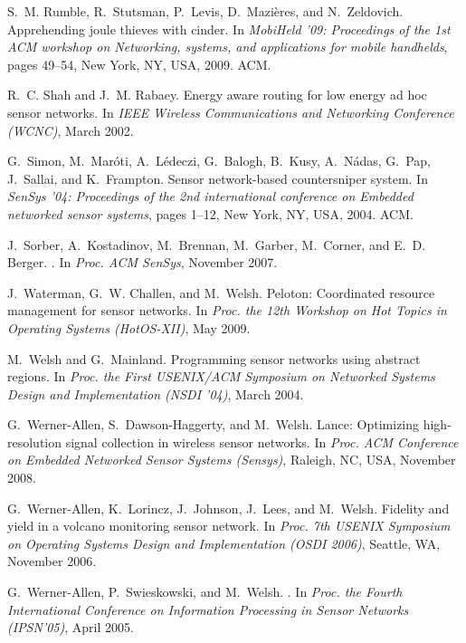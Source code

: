 \documentclass{sig-alternate}
\begin{document}
\begin{footnotesize}
\begin{thebibliography}{10}
S.~M. Rumble, R.~Stutsman, P.~Levis, D.~Mazi\`{e}res, and N.~Zeldovich.
\newblock Apprehending joule thieves with cinder.
\newblock In {\em MobiHeld '09: Proceedings of the 1st ACM workshop on
  Networking, systems, and applications for mobile handhelds}, pages 49--54,
  New York, NY, USA, 2009. ACM.

R.~C. Shah and J.~M. Rabaey.
\newblock Energy aware routing for low energy ad hoc sensor networks.
\newblock In {\em IEEE Wireless Communications and Networking Conference
  (WCNC)}, March 2002.

G.~Simon, M.~Mar\'{o}ti, A.~L\'{e}deczi, G.~Balogh, B.~Kusy, A.~N\'{a}das,
  G.~Pap, J.~Sallai, and K.~Frampton.
\newblock Sensor network-based countersniper system.
\newblock In {\em SenSys '04: Proceedings of the 2nd international conference
  on Embedded networked sensor systems}, pages 1--12, New York, NY, USA, 2004.
  ACM.

J.~Sorber, A.~Kostadinov, M.~Brennan, M.~Garber, M.~Corner, and E.~D. Berger.
.
\newblock In {\em Proc. ACM SenSys}, November 2007.

J.~Waterman, G.~W. Challen, and M.~Welsh.
\newblock Peloton: Coordinated resource management for sensor networks.
\newblock In {\em Proc. the 12th Workshop on Hot Topics in Operating Systems
  (HotOS-XII)}, May 2009.

M.~Welsh and G.~Mainland.
\newblock Programming sensor networks using abstract regions.
\newblock In {\em Proc. the First USENIX/ACM Symposium on Networked Systems
  Design and Implementation (NSDI '04)}, March 2004.

G.~Werner-Allen, S.~Dawson-Haggerty, and M.~Welsh.
\newblock Lance: Optimizing high-resolution signal collection in wireless
  sensor networks.
\newblock In {\em Proc. ACM Conference on Embedded Networked Sensor Systems
  (Sensys)}, Raleigh, NC, USA, November 2008.

G.~Werner-Allen, K.~Lorincz, J.~Johnson, J.~Lees, and M.~Welsh.
\newblock Fidelity and yield in a volcano monitoring sensor network.
\newblock In {\em Proc. 7th USENIX Symposium on Operating Systems Design and
  Implementation (OSDI 2006)}, Seattle, WA, November 2006.

G.~Werner-Allen, P.~Swieskowski, and M.~Welsh.
.
\newblock In {\em Proc. the Fourth International Conference on Information
  Processing in Sensor Networks (IPSN'05)}, April 2005.


\end{thebibliography}
\end{footnotesize}
\end{document}
